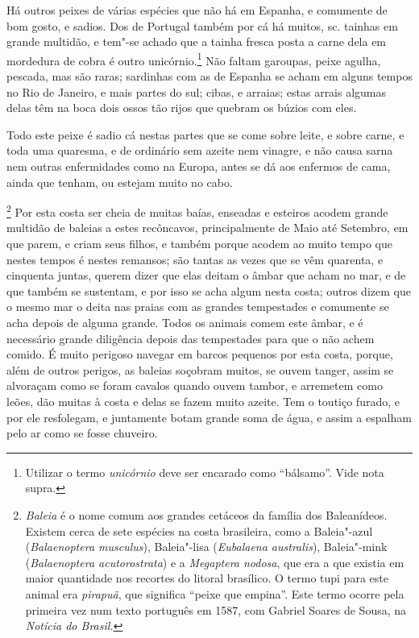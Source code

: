  Há outros peixes de várias espécies que não há em Espanha, e comumente
de bom gosto, e sadios. Dos de Portugal também por cá há muitos, sc.
tainhas em grande multidão, e tem"-se achado que a tainha fresca posta a
carne dela em mordedura de cobra é outro unicórnio.\footnote{ Utilizar 
o termo \textit{unicórnio} deve ser encarado como
``bálsamo''. Vide nota supra.} Não faltam garoupas, peixe agulha,
pescada, mas são raras; sardinhas com as de Espanha se acham em alguns
tempos no Rio de Janeiro, e mais partes do sul; cibas, e arraias; estas
arrais algumas delas têm na boca dois ossos tão rijos que quebram os búzios com eles. 

 Todo este peixe é sadio cá nestas partes que se come sobre leite, e
sobre carne, e toda uma quaresma, e de ordinário sem azeite nem
vinagre, e não causa sarna nem outras enfermidades como na Europa,
antes se dá aos enfermos de cama, ainda que tenham, ou estejam muito no cabo.

\footnote{ \textit{Baleia} é o nome comum aos grandes
cetáceos da família dos Baleanídeos. Existem cerca de sete espécies na
costa brasileira, como a Baleia"-azul (\textit{Balaenoptera musculus}), 
Baleia"-lisa (\textit{Eubalaena australis}), Baleia"-mink 
(\textit{Balaenoptera acutorostrata}) e a \textit{Megaptera nodosa}, 
que era a que existia em maior quantidade nos recortes do litoral
brasílico. O termo tupi para este animal era \textit{pirapuã}, que
significa ``peixe que empina''. Este termo ocorre pela primeira vez num
texto português em 1587, com Gabriel Soares de Sousa, na
\textit{Notícia do Brasil.}} Por esta costa ser cheia de
muitas baías, enseadas e esteiros acodem grande multidão de baleias a
estes recôncavos, principalmente de Maio até Setembro, em que parem, e
criam seus filhos, e também porque acodem ao muito tempo que nestes
tempos é nestes remansos; são tantas as vezes que se vêm quarenta, e
cinquenta juntas, querem dizer que elas deitam o âmbar que acham no
mar, e de que também se sustentam, e por isso se acha algum nesta
costa; outros dizem que o mesmo mar o deita nas praias com as grandes
tempestades e comumente se acha depois de alguma grande. Todos os
animais comem este âmbar, e é necessário grande diligência depois das
tempestades para que o não achem comido. É muito perigoso navegar em
barcos pequenos por esta costa, porque, além de outros perigos, as
baleias soçobram muitos, se ouvem tanger, assim se alvoraçam como se
foram cavalos quando ouvem tambor, e arremetem como leões, dão muitas à
costa e delas se fazem muito azeite. Tem o toutiço furado, e por ele
resfolegam, e juntamente botam grande soma de água, e assim a espalham
pelo ar como se fosse chuveiro.

